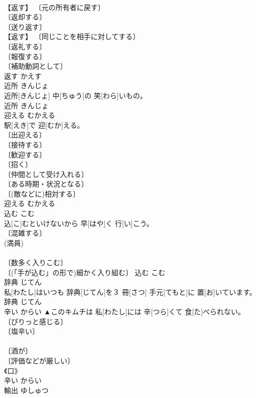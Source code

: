 \documentclass[8pt]{extreport}
\begin{document}
\begin{CJK}{UTF8}{min}
\\	【返す】 〔元の所有者に戻す〕 
\\	〔返却する〕 
\\	〔送り返す〕 
\\	【返す】 〔同じことを相手に対してする〕 
\\	〔返礼する〕 
\\	〔報復する〕 
\\	〔補助動詞として〕 
\\	返す	かえす	
\\	近所	きんじょ	
\\	近所[きんじょ] 中[ちゅう]の 笑[わら]いもの。	
\\	近所	きんじょ	
\\	迎える	むかえる	
\\	駅[えき]で 迎[むか]える。	
\\	〔出迎える〕 
\\	〔接待する〕 
\\	〔歓迎する〕 
\\	〔招く〕 
\\	〔仲間として受け入れる〕 
\\	〔ある時期・状況となる〕 
\\	〔(敵などに)相対する〕 
\\	迎える	むかえる	
\\	込む	こむ	
\\	込[こ]むといけないから 早[はや]く 行[い]こう。	
\\	〔混雑する〕 
\\	(満員) 
\\	[⇒こみあう] 
\\	〔数多く入りこむ〕 
\\	〔(「手が込む」の形で)細かく入り組む〕	込む	こむ	
\\	辞典	じてん	
\\	私[わたし]はいつも 辞典[じてん]を３ 冊[さつ] 手元[てもと]に 置[お]いています。	
\\	[＝じしょ５]	辞典	じてん	
\\	辛い	からい	▲このキムチは 私[わたし]には 辛[つら]くて 食[た]べられない。	
\\	〔ぴりっと感じる〕 
\\	〔塩辛い〕 
\\	[＝しおからい] 
\\	〔酒が〕 
\\	〔評価などが厳しい〕 
\\	《口》 
\\	辛い	からい	
\\	輸出	ゆしゅつ	

\end{CJK}
\end{document}
